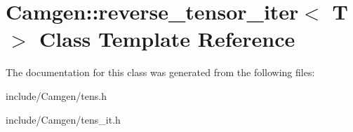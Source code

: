 \hypertarget{a00469}{\section{Camgen\-:\-:reverse\-\_\-tensor\-\_\-iter$<$ T $>$ Class Template Reference}
\label{a00469}
}


The documentation for this class was generated from the following files\-:\begin{DoxyCompactItemize}
\item 
include/\-Camgen/tens.\-h\item 
include/\-Camgen/tens\-\_\-it.\-h\end{DoxyCompactItemize}
